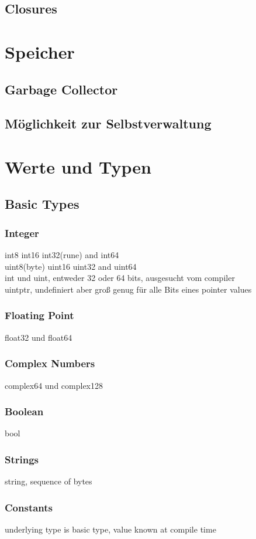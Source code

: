 \subsection{Closures}

\section{Speicher}
\subsection{Garbage Collector}
\subsection{Möglichkeit zur Selbstverwaltung}

\section{Werte und Typen}
\subsection{Basic Types}
\subsubsection{Integer}
int8 int16 int32(rune) and int64\\uint8(byte) uint16 uint32 and uint64\\int und uint, entweder 32 oder 64 bits, ausgesucht vom compiler\\uintptr, undefiniert aber groß genug für alle Bits eines pointer values
\subsubsection{Floating Point}
float32 und float64
\subsubsection{Complex Numbers}
complex64 und complex128
\subsubsection{Boolean}
bool
\subsubsection{Strings}
string, sequence of bytes
\subsubsection{Constants}
underlying type is basic type, value known at compile time

